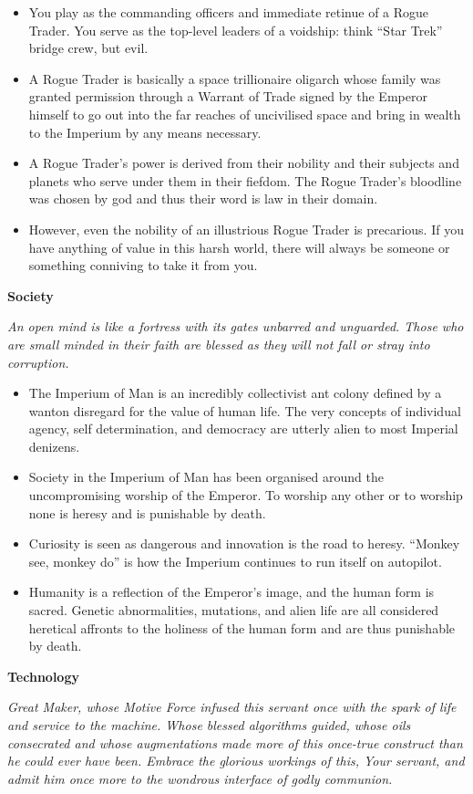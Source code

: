 \documentclass[10pt,a4paper]{article}
\newcommand{\rpgsection}[1]{%
  \vspace{0.8em}%
  {\headerfont\bfseries\Large #1}\par%
  \vspace{0.5em}%
}
\begin{document}
\begin{multicols}{2}
\begin{itemize}
  \item You play as the commanding officers and immediate retinue of a Rogue Trader. You serve as the top-level leaders of a voidship: think “Star Trek” bridge crew, but evil.
  \item A Rogue Trader is basically a space trillionaire oligarch whose family was granted permission through a Warrant of Trade signed by the Emperor himself to go out into the far reaches of uncivilised space and bring in wealth to the Imperium by any means necessary.
  \item A Rogue Trader’s power is derived from their nobility and their subjects and planets who serve under them in their fiefdom. The Rogue Trader’s bloodline was chosen by god and thus their word is law in their domain.
  \item However, even the nobility of an illustrious Rogue Trader is precarious. If you have anything of value in this harsh world, there will always be someone or something conniving to take it from you.
\end{itemize}

\rpgsection{Society}
\textit{An open mind is like a fortress with its gates unbarred and unguarded. Those who are small minded in their faith are blessed as they will not fall or stray into corruption.}

\begin{itemize}
  \item The Imperium of Man is an incredibly collectivist ant colony defined by a wanton disregard for the value of human life. The very concepts of individual agency, self determination, and democracy are utterly alien to most Imperial denizens.
  \item Society in the Imperium of Man has been organised around the uncompromising worship of the Emperor. To worship any other or to worship none is heresy and is punishable by death.
  \item Curiosity is seen as dangerous and innovation is the road to heresy. “Monkey see, monkey do” is how the Imperium continues to run itself on autopilot.
  \item Humanity is a reflection of the Emperor’s image, and the human form is sacred. Genetic abnormalities, mutations, and alien life are all considered heretical affronts to the holiness of the human form and are thus punishable by death.
\end{itemize}

\rpgsection{Technology}
\textit{Great Maker, whose Motive Force infused this servant once with the spark of life and service to the machine. Whose blessed algorithms guided, whose oils consecrated and whose augmentations made more of this once-true construct than he could ever have been. Embrace the glorious workings of this, Your servant, and admit him once more to the wondrous interface of godly communion.}


\end{multicols}
\end{document}
